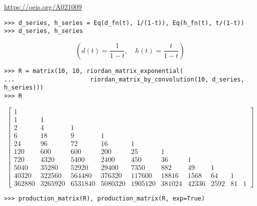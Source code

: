 \begin{example}
\url{https://oeis.org/A021009}
\begin{verbatim}
>>> d_series, h_series = Eq(d_fn(t), 1/(1-t)), Eq(h_fn(t), t/(1-t))
>>> d_series, h_series
\end{verbatim}
\begin{displaymath}
\left ( d{\left (t \right )} = \frac{1}{1-t}, \quad h{\left (t \right )} = \frac{t}{1-t}\right )
\end{displaymath}
\begin{verbatim}
>>> R = matrix(10, 10, riordan_matrix_exponential(
...                     riordan_matrix_by_convolution(10, d_series, h_series)))
>>> R
\end{verbatim}
\begin{displaymath}
\left[\begin{matrix}1 &   &   &   &   &   &   &   &   &  \\1 & 1 &   &   &   &   &   &   &   &  \\2 & 4 & 1 &   &   &   &   &   &   &  \\6 & 18 & 9 & 1 &   &   &   &   &   &  \\24 & 96 & 72 & 16 & 1 &   &   &   &   &  \\120 & 600 & 600 & 200 & 25 & 1 &   &   &   &  \\720 & 4320 & 5400 & 2400 & 450 & 36 & 1 &   &   &  \\5040 & 35280 & 52920 & 29400 & 7350 & 882 & 49 & 1 &   &  \\40320 & 322560 & 564480 & 376320 & 117600 & 18816 & 1568 & 64 & 1 &  \\362880 & 3265920 & 6531840 & 5080320 & 1905120 & 381024 & 42336 & 2592 & 81 & 1\end{matrix}\right]
\end{displaymath}
\begin{verbatim}
>>> production_matrix(R), production_matrix(R, exp=True)
\end{verbatim}
\begin{displaymath}

\end{displaymath}
\end{example}
